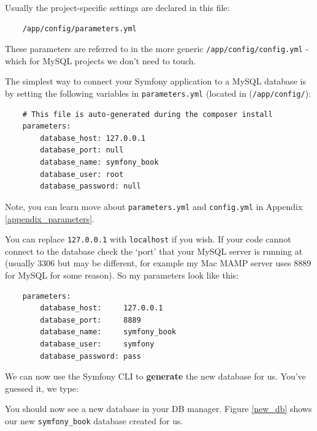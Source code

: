 \documentclass[a4paperpaper,openright]{book}
\newenvironment{Shaded}{}{}
\newcommand{\ExtensionTok}[1]{#1}
\newcommand{\NormalTok}[1]{#1}
\begin{document}
Usually the project-specific settings are declared in this file:

\begin{verbatim}
    /app/config/parameters.yml
\end{verbatim}

These parameters are referred to in the more generic
\texttt{/app/config/config.yml} - which for MySQL projects we don't need
to touch.

The simplest way to connect your Symfony application to a MySQL database
is by setting the following variables in \texttt{parameters.yml}
(located in (\texttt{/app/config/}):

\begin{verbatim}
    # This file is auto-generated during the composer install
    parameters:
        database_host: 127.0.0.1
        database_port: null
        database_name: symfony_book
        database_user: root
        database_password: null
\end{verbatim}

Note, you can learn move about \texttt{parameters.yml} and
\texttt{config.yml} in Appendix \ref{appendix_parameters}.

You can replace \texttt{127.0.0.1} with \texttt{localhost} if you wish.
If your code cannot connect to the database check the `port' that your
MySQL server is running at (usually 3306 but may be different, for
example my Mac MAMP server uses 8889 for MySQL for some reason). So my
parameters look like this:

\begin{verbatim}
    parameters:
        database_host:     127.0.0.1
        database_port:     8889
        database_name:     symfony_book
        database_user:     symfony
        database_password: pass
\end{verbatim}

We can now use the Symfony CLI to \textbf{generate} the new database for
us. You've guessed it, we type:

\begin{Shaded}
\end{Shaded}

You should now see a new database in your DB manager. Figure
\ref{new_db} shows our new \texttt{symfony\_book} database created for
us.
\end{document}
